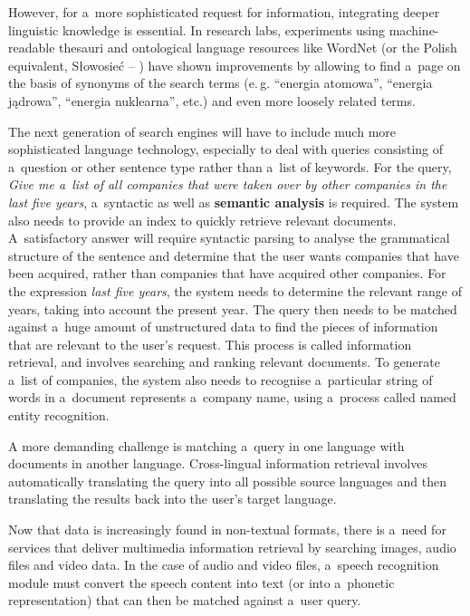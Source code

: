 \begin{multicols}{2}
However, for a~more sophisticated request for information, integrating
deeper linguistic knowledge is essential. In research labs,
experiments using machine-readable thesauri and ontological language
resources like WordNet (or the Polish equivalent, Słowosieć --
\cite{Slowosiec1, Piasecki2009}) have shown improvements by allowing
to find a~page on the basis of synonyms of the search terms (e.\,g.
“energia atomowa”, “energia jądrowa”, “energia
nuklearna”, etc.) and even more loosely related terms. 


The next generation of search engines will have to include much more
sophisticated language technology, especially to deal with queries
consisting of a~question or other sentence type rather than a~list of
keywords. For the query, \textit{Give me a~list of all companies that
were taken over by other companies in the last five years},
a~syntactic as well as \textbf{semantic analysis} is required. The
system also needs to provide an index to quickly retrieve relevant
documents. A~satisfactory answer will require syntactic parsing to
analyse the grammatical structure of the sentence and determine that
the user wants companies that have been acquired, rather than
companies that have acquired other companies. For the expression
\textit{last five years}, the system needs to determine the relevant
range of years, taking into account the present year. The query then
needs to be matched against a~huge amount of unstructured data to find
the pieces of information that are relevant to the user’s request.
This process is called information retrieval, and involves searching
and ranking relevant documents. To generate a~list of companies, the
system also needs to recognise a~particular string of words in
a~document represents a~company name, using a~process called named
entity recognition. 

A more demanding challenge is matching a~query in one language with
documents in another language. Cross-lingual information retrieval
involves automatically translating the query into all possible source
languages and then translating the results back into the user's target
language. 

Now that data is increasingly found in non-textual formats, there is
a~need for services that deliver multimedia information retrieval by
searching images, audio files and video data. In the case of audio and
video files, a~speech recognition module must convert the speech
content into text (or into a~phonetic representation) that can then be
matched against a~user query. 


\end{multicols}

